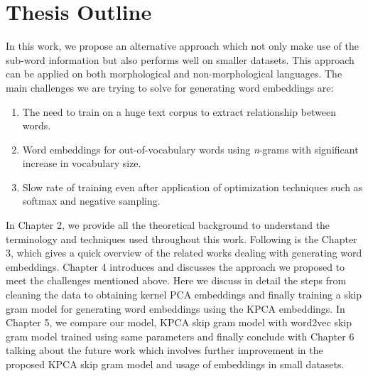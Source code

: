 \section{Thesis Outline}
In this work, we propose an alternative approach which not only make use of the sub-word information but also performs well on smaller datasets. This approach can be applied on both morphological and non-morphological languages. The main challenges we are trying to solve for generating word embeddings are:
\begin{enumerate}
	\item The need to train on a huge text corpus to extract relationship between words.
	\item Word embeddings for out-of-vocabulary words using \textit{n}-grams with significant increase in vocabulary size.
	\item Slow rate of training even after application of optimization techniques such as softmax and negative sampling.
\end{enumerate}
In Chapter 2, we provide all the theoretical background to understand the terminology and techniques used throughout this work. Following is the Chapter 3, which gives a quick overview of the related works dealing with generating word embeddings. Chapter 4 introduces and discusses the approach we proposed to meet the challenges mentioned above. Here we discuss in detail the steps from cleaning the data to obtaining kernel PCA embeddings and finally training a skip gram model for generating word embeddings using the KPCA embeddings. In Chapter 5, we compare our model, KPCA skip gram model with word2vec skip gram model trained using same parameters and finally conclude with Chapter 6 talking about the future work which involves further improvement in the proposed KPCA skip gram model and usage of embeddings in small datasets. 
